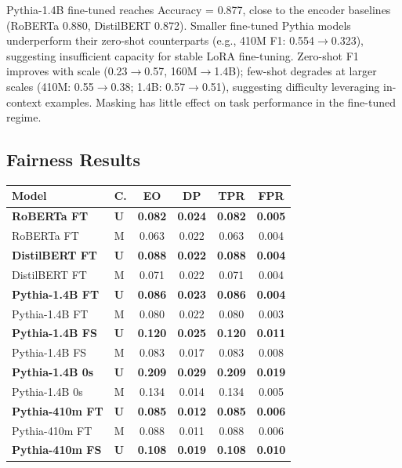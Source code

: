 \documentclass[11pt]{article}
\begin{document}
Pythia-1.4B fine-tuned reaches Accuracy = 0.877, close to the encoder baselines (RoBERTa 0.880, DistilBERT 0.872). Smaller fine-tuned Pythia models underperform their zero-shot counterparts (e.g., 410M F1: 0.554$\to$0.323), suggesting insufficient capacity for stable LoRA fine-tuning. Zero-shot F1 improves with scale (0.23$\to$0.57, 160M$\to$1.4B); few-shot degrades at larger scales (410M: 0.55$\to$0.38; 1.4B: 0.57$\to$0.51), suggesting difficulty leveraging in-context examples. Masking has little effect on task performance in the fine-tuned regime.

\subsection{Fairness Results}
\label{sec:fairness}
\begin{table}[h]
\centering\small
\setlength{\tabcolsep}{4pt}
\begin{tabular}{llcccc}
\toprule
\textbf{Model} & \textbf{C.} & \textbf{EO} & \textbf{DP} & \textbf{TPR} & \textbf{FPR} \\
\midrule
\textbf{RoBERTa FT} & \textbf{U} & \textbf{0.082} & \textbf{0.024} & \textbf{0.082} & \textbf{0.005} \\
RoBERTa FT & M & 0.063 & 0.022 & 0.063 & 0.004 \\
\textbf{DistilBERT FT} & \textbf{U} & \textbf{0.088} & \textbf{0.022} & \textbf{0.088} & \textbf{0.004} \\
DistilBERT FT & M & 0.071 & 0.022 & 0.071 & 0.004 \\
\textbf{Pythia-1.4B FT} & \textbf{U} & \textbf{0.086} & \textbf{0.023} & \textbf{0.086} & \textbf{0.004} \\
Pythia-1.4B FT & M & 0.080 & 0.022 & 0.080 & 0.003 \\
\textbf{Pythia-1.4B FS} & \textbf{U} & \textbf{0.120} & \textbf{0.025} & \textbf{0.120} & \textbf{0.011} \\
Pythia-1.4B FS & M & 0.083 & 0.017 & 0.083 & 0.008 \\
\textbf{Pythia-1.4B 0s} & \textbf{U} & \textbf{0.209} & \textbf{0.029} & \textbf{0.209} & \textbf{0.019} \\
Pythia-1.4B 0s & M & 0.134 & 0.014 & 0.134 & 0.005 \\
\textbf{Pythia-410m FT} & \textbf{U} & \textbf{0.085} & \textbf{0.012} & \textbf{0.085} & \textbf{0.006} \\
Pythia-410m FT & M & 0.088 & 0.011 & 0.088 & 0.006 \\
\textbf{Pythia-410m FS} & \textbf{U} & \textbf{0.108} & \textbf{0.019} & \textbf{0.108} & \textbf{0.010} \\

\end{tabular}
\end{table}
\end{document}
